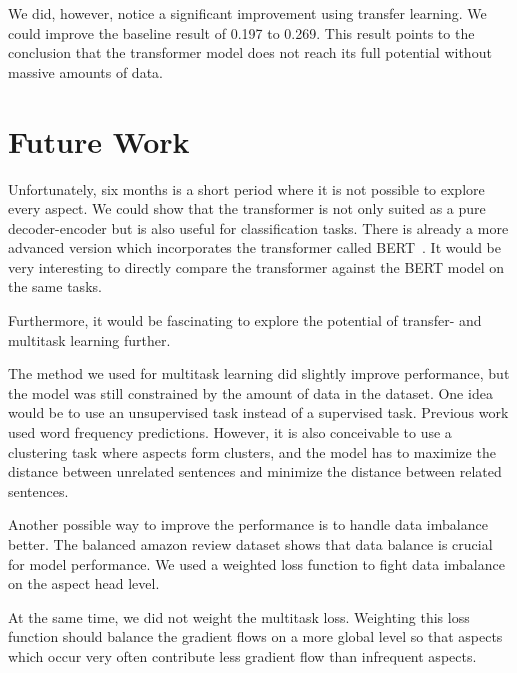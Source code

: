 We did, however, notice a significant improvement using transfer learning. We could improve the baseline result of 0.197 to 0.269. This result points to the conclusion that the transformer model does not reach its full potential without massive amounts of data.


\section{Future Work}

Unfortunately, six months is a short period where it is not possible to explore every aspect. We could show that the transformer is not only suited as a pure decoder-encoder but is also useful for classification tasks. There is already a more advanced version which incorporates the transformer called BERT~\cite{Devlin2018a}. It would be very interesting to directly compare the transformer against the BERT model on the same tasks.
\medskip

Furthermore, it would be fascinating to explore the potential of transfer- and multitask learning further.
\smallskip

The method we used for multitask learning did slightly improve performance, but the model was still constrained by the amount of data in the dataset. One idea would be to use an unsupervised task instead of a supervised task. Previous work used word frequency predictions. However, it is also conceivable to use a clustering task where aspects form clusters, and the model has to maximize the distance between unrelated sentences and minimize the distance between related sentences.
\medskip

Another possible way to improve the performance is to handle data imbalance better. The balanced amazon review dataset shows that data balance is crucial for model performance. We used a weighted loss function to fight data imbalance on the aspect head level.
\smallskip

At the same time, we did not weight the multitask loss. Weighting this loss function should balance the gradient flows on a more global level so that aspects which occur very often contribute less gradient flow than infrequent aspects.